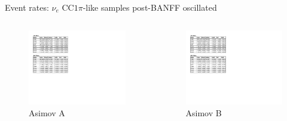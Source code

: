 \documentclass{beamer}
\begin{document}
\begin{frame}{Event rates: $\nu_e\text{ CC}1\pi$-like samples post-BANFF oscillated}
	\centering
	\begin{columns}
		\begin{column}{0.5\paperwidth}
			\begin{figure}
				\includegraphics[page=3, trim={0cm 15cm 13cm 1cm}, clip, scale=0.52] {images/rates/postfit_A}
				\caption*{Asimov A}
			\end{figure}
		\end{column}
		\begin{column}{0.5\paperwidth}
			\begin{figure}
				\includegraphics[page=3, trim={0cm 15cm 13cm 1cm}, clip, scale=0.52] {images/rates/postfit_B}
				\caption*{Asimov B}
			\end{figure}
		\end{column}
	\end{columns}
\end{frame}
\end{document}
